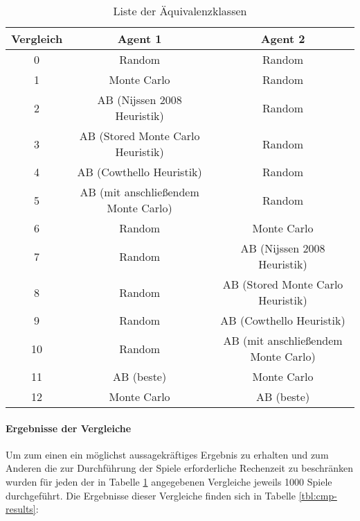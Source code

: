 \begin{table}[ht]
\begin{center}
\begin{tabular}{| c | c | c |} \hline
Vergleich & Agent 1 & Agent 2 \\ \hline
\hline
0 & Random & Random  \\ \hline
\hline
1 & Monte Carlo & Random  \\ \hline
2 & AB (Nijssen 2008 Heuristik) & Random\\ \hline
3 & AB (Stored Monte Carlo Heuristik) & Random\\ \hline
4 & AB (Cowthello Heuristik) & Random\\ \hline
5 & AB (mit anschließendem Monte Carlo) & Random\\ \hline
\hline
6 & Random & Monte Carlo\\ \hline
7 & Random & AB (Nijssen 2008 Heuristik)\\ \hline
8 & Random & AB (Stored Monte Carlo Heuristik)\\ \hline
9 & Random & AB (Cowthello Heuristik)\\ \hline
10 & Random & AB (mit anschließendem Monte Carlo)\\ \hline
\hline
11 & AB (beste) & Monte Carlo\\ \hline
12 & Monte Carlo & AB (beste)\\ \hline
\end{tabular}
\end{center}
\caption{Liste der Äquivalenzklassen}
\label{tbl:cmp-agents}
\end{table}

\paragraph{Ergebnisse der Vergleiche}
\label{p:vgl-result}
Um zum einen ein möglichst aussagekräftiges Ergebnis zu erhalten und zum Anderen die zur Durchführung der Spiele erforderliche Rechenzeit zu beschränken wurden für jeden der in Tabelle \ref{tbl:cmp-agents} angegebenen Vergleiche jeweils 1000 Spiele durchgeführt. Die Ergebnisse dieser Vergleiche finden sich in Tabelle \ref{tbl:cmp-results}:

